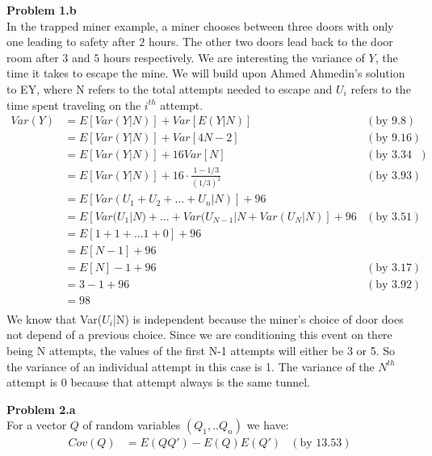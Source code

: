 \documentclass[12pt]{article}
\begin{document}
\textbf{Problem 1.b}\\
In the trapped miner example, a miner chooses between three doors with only one leading to safety after $2$ hours. The other two doors lead back to the door room after $3$ and $5$ hours respectively.\newline
\newline
We are interesting the variance of $Y$, the time it takes to escape the mine. We will build upon Ahmed Ahmedin's solution to EY, where N refers to the total attempts needed to escape and $U_{i}$ refers to the time spent traveling on the $i^{th}$ attempt. 
\begin{equation*}
	\begin{aligned}
	Var(Y)	&= E[Var(Y|N)] + Var[E(Y|N)]	&(\textrm{by 9.8})\\
			&= E[Var(Y|N)] + Var[4N-2]	&(\textrm{by 9.16})\\
			&= E[Var(Y|N)] + 16Var[N]	&(\textrm{by 3.34 and 3.41})\\
			&= E[Var(Y|N)] + 16\cdot\frac{1-1/3}{(1/3)^{2}}	&(\textrm{by 3.93})\\
			&= E[Var(U_{1} + U_{2} + ... + U_{n} |N)] + 96\\
			&= E[Var(U_{1}|N) + ... + Var(U_{N-1}|N + Var(U_{N}|N)] + 96 &(\textrm{by 3.51})\\
			&= E[ 1 + 1 + ... 1 + 0 ] + 96\\
			&= E[N-1] + 96\\
			&= E[N] - 1 + 96	&(\textrm{by 3.17})\\
			&= 3 - 1 + 96	&(\textrm{by 3.92})\\
			&= 98\\
	\end{aligned}
\end{equation*}
We know that Var($U_{i}$|N) is independent because the miner's choice of door does not depend of a previous choice. Since we are conditioning this event on there being N attempts, the values of the first N-1 attempts will either be 3 or 5. So the variance of an individual attempt in this case is 1. The variance of the $N^{th}$ attempt is 0 because that attempt always is the same tunnel.

\pagebreak
\textbf{Problem 2.a}\\
For a vector $Q$ of random variables $(Q_1,..Q_n)$ we have:
\begin{equation*}
	\begin{aligned}
	Cov(Q)	&= E(QQ') - E(Q)E(Q') &(\textrm{by 13.53})\\
	\end{aligned}
\end{equation*}
\end{document}
